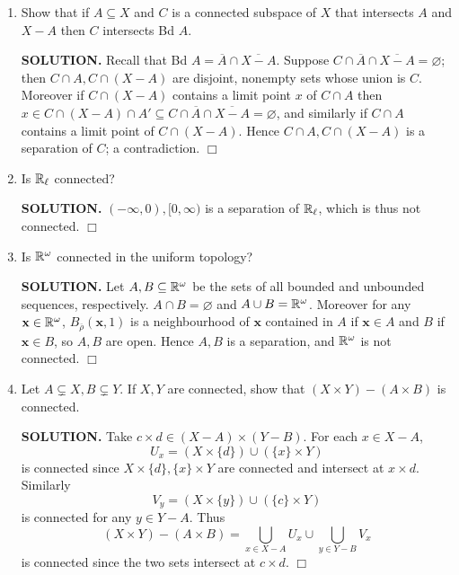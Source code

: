 \documentclass{article}
\begin{document}
\begin{enumerate}
    {\bf SOLUTION.} Suppose $Y \subseteq X$ contains at least two distinct points and $y \in Y$. Then $\{y\}, Y - \{y\}$ are nonempty disjoint open sets in $Y$ whose union is $Y$, so $Y$ is not connected.

    As a counterexample to the converse, $X = \rats$ in the standard topology is totally disconnected but is not in the discrete topology. $\Box$

    \item Show that if $A \subseteq X$ and $C$ is a connected subspace of $X$ that intersects $A$ and $X-A$ then $C$ intersects Bd $A$.

    {\bf SOLUTION.} Recall that Bd $A = \overline{A} \cap \overline{X - A}$. Suppose $C \cap \overline{A} \cap \overline{X - A} = \varnothing$; then $C \cap A, C \cap (X - A)$ are disjoint, nonempty sets whose union is $C$. Moreover if $C \cap (X-A)$ contains a limit point $x$ of $C \cap A$ then $x \in C \cap (X-A) \cap A' \subseteq C \cap \overline{A} \cap \overline{X-A} = \varnothing$, and similarly if $C \cap A$ contains a limit point of $C \cap (X-A)$. Hence $C \cap A, C \cap (X-A)$ is a separation of $C$; a contradiction. $\Box$

    \item Is $\mathbb{R}_\ell$ connected?

    {\bf SOLUTION.} $(-\infty, 0), [0, \infty)$ is a separation of $\mathbb{R}_\ell$, which is thus not connected. $\Box$

    \item Is $\mathbb{R}^\omega$ connected in the uniform topology?

    {\bf SOLUTION.} Let $A, B \subseteq \mathbb{R}^\omega$ be the sets of all bounded and unbounded sequences, respectively. $A \cap B = \varnothing$ and $A \cup B = \mathbb{R}^\omega$. Moreover for any $\mathbf{x} \in \mathbb{R}^\omega$, $B_{\overline{\rho}}(\mathbf{x}, 1)$ is a neighbourhood of $\mathbf{x}$ contained in $A$ if $\mathbf{x} \in A$ and $B$ if $\mathbf{x} \in B$, so $A, B$ are open. Hence $A, B$ is a separation, and $\mathbb{R}^\omega$ is not connected. $\Box$

    \item Let $A \subsetneq X, B \subsetneq Y$. If $X, Y$ are connected, show that $(X \times Y) - (A \times B)$ is connected.

    {\bf SOLUTION.} Take $c \times d \in (X-A) \times (Y-B)$. For each $x \in X-A$,
    $$U_x = (X \times \{d\}) \cup (\{x\} \times Y)$$
    is connected since $X \times \{d\}, \{x\} \times Y$ are connected and intersect at $x \times d$. Similarly
    $$V_y = (X \times \{y\}) \cup (\{c\} \times Y)$$
    is connected for any $y \in Y - A$. Thus 
    $$(X \times Y) - (A \times B) = \bigcup_{x \in X-A} U_x \cup \bigcup_{y \in Y-B} V_x$$
    is connected since the two sets intersect at $c \times d$. $\Box$


\end{enumerate}
\end{document}
